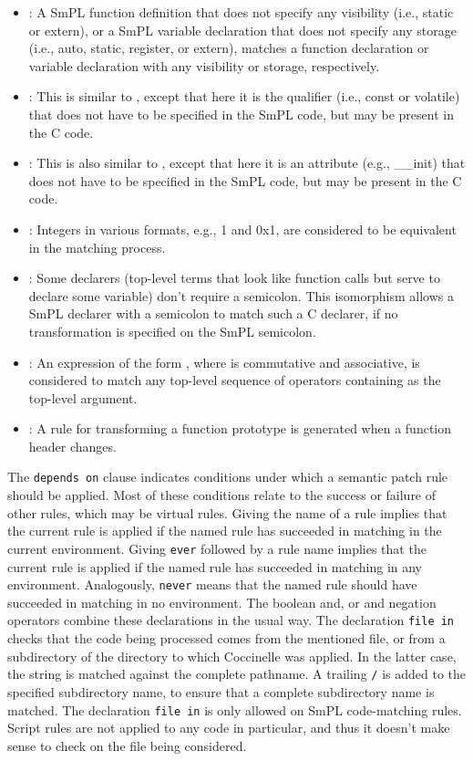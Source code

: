 \begin{itemize}
\item {}: A SmPL function definition that does not
  specify any visibility (i.e., static or extern), or a SmPL variable
  declaration that does not specify any storage (i.e., auto, static,
  register, or extern), matches a function declaration or variable
  declaration with any visibility or storage, respectively.
\item {}: This is similar to ,
  except that here it is the qualifier (i.e., const or volatile) that does
  not have to be specified in the SmPL code, but may be present in the C code.
\item {}: This is also similar to
  , except that here it is an attribute (e.g.,
  \_\_init) that does not have to be specified in the SmPL code, but may be
  present in the C code.
\item {}: Integers in various formats, e.g., 1 and 0x1, are
  considered to be equivalent in the matching process.
\item {}: Some declarers (top-level terms
  that look like function calls but serve to declare some variable) don't
  require a semicolon.  This isomorphism allows a SmPL declarer with a semicolon
  to match such a C declarer, if no transformation is specified on the SmPL
  semicolon.
\item {}: An expression of the form  
  , where  is commutative and associative, is
  considered to match any top-level sequence of  operators
  containing  as the top-level argument.
\item {}: A rule for transforming a function prototype is
  generated when a function header changes.
\end{itemize}

The \texttt{depends on} clause indicates conditions under which a semantic
patch rule should be applied.  Most of these conditions relate to the
success or failure of other rules, which may be virtual rules.  Giving the
name of a rule implies that the current rule is applied if the named rule
has succeeded in matching in the current environment.  Giving \texttt{ever}
followed by a rule name implies that the current rule is applied if the
named rule has succeeded in matching in any environment.  Analogously,
\texttt{never} means that the named rule should have succeeded in matching
in no environment.  The boolean and, or and negation operators combine
these declarations in the usual way.  The declaration {\tt file in} checks
that the code being processed comes from the mentioned file, or from a
subdirectory of the directory to which Coccinelle was applied.  In the
latter case, the string is matched against the complete pathname.  A
trailing {\tt /} is added to the specified subdirectory name, to ensure
that a complete subdirectory name is matched.  The
declaration {\tt file in} is only allowed on SmPL code-matching rules.
Script rules are not applied to any code in particular, and thus it doesn't
make sense to check on the file being considered.

